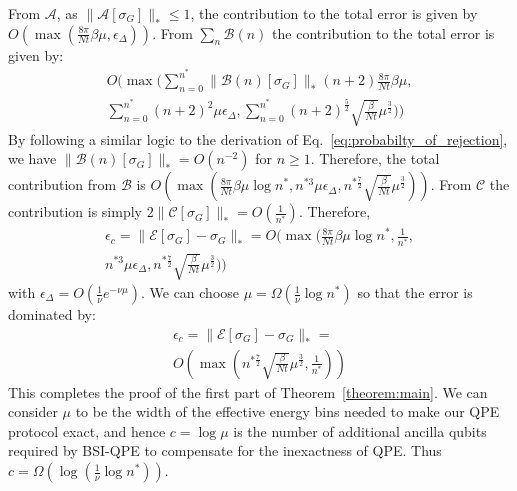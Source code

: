 \documentclass[aps,floatfix,10pt,amssymb,amsfont,amsmath,superscriptaddress,float,nofootinbib,longbibliography,nobalancelastpage,twocolumn]{revtex4-2}
\begin{document}
From $\mathcal{A}$, as $\|\mathcal{A}[\sigma_G]\|_* \leq 1$, the contribution to the total error is given by $O(\max(\frac{8\pi}{Nt}\beta\mu,\epsilon_{\Delta}))$. From $\sum_n\mathcal{B}(n)$ the contribution to the total error is given by:
\begin{multline}
    O\!\bigg(\max\!\bigg(\sum_{n=0}^{n^*}\|\mathcal B(n)[\sigma_G]\|_* (n+2)\frac{8\pi}{Nt}\beta \mu,\\
    \sum_{n=0}^{n^*}(n+2)^2\mu\epsilon_{\Delta}, \sum_{n=0}^{n^*}(n+2)^{\frac{5}{2}}\sqrt{\frac{\beta }{Nt}}\mu^{\frac{3}{2}}\bigg)\bigg)
\end{multline}
By following a similar logic to the derivation of Eq.~\eqref{eq:probabilty_of_rejection}, we have $\|\mathcal B(n)[\sigma_G]\|_* = O(n^{-2})$ for $n\geq1$. Therefore, the total contribution from $\mathcal{B}$ is $O(\!\max(\frac{8\pi}{Nt}\beta \mu \log n^*,n^{*3}\mu\epsilon_{\Delta},n^{*\frac{7}{2}}\sqrt{\frac{\beta }{Nt}}\mu^{\frac{3}{2}}))$. From $\mathcal{C}$ the contribution is simply $2\|\mathcal{C}[\sigma_G]\|_* = O(\frac{1}{n^*})$. Therefore,
 \begin{multline}
   \epsilon_c = \|\mathcal{E}[\sigma_G] - \sigma_G\|_* = O\bigg(\max\bigg( \frac{8\pi}{Nt}\beta\mu \log n^* ,\frac{1}{n^*},\\ n^{*3}\mu\epsilon_{\Delta},n^{*\frac{7}{2}}\sqrt{\frac{\beta }{Nt}}\mu^{\frac{3}{2}}\bigg)\bigg)
   \label{eq:combinedtotalerror}
\end{multline}
with $\epsilon_{\Delta}=O(\frac{1}{\nu}e^{-\nu\mu})$. We can choose $\mu = \Omega(\frac{1}{\nu}\log n^*)$ so that the error is dominated by:
 \begin{multline}
   \epsilon_c = \|\mathcal{E}[\sigma_G] - \sigma_G\|_* =\\ O\left(\max\left( n^{*\frac{7}{2}}\sqrt{\frac{\beta }{Nt}}\mu^{\frac{3}{2}} ,\frac{1}{n^*}\right)\right)
    \label{eq:error_bound}
\end{multline}
This completes the proof of the first part of Theorem~\ref{theorem:main}. We can consider $\mu$ to be the width of the effective energy bins needed to make our QPE protocol exact, and hence $c=\log\mu$ is the number of additional ancilla qubits required by BSI-QPE to compensate for the inexactness of QPE. Thus $c=\Omega(\log(\frac{1}{\nu}\log n^*))$.
\end{document}
